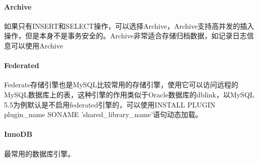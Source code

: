 \documentclass[../../../interview-questions.tex]{subfiles}
\begin{document}
 
\paragraph{Archive}

如果只有INSERT和SELECT操作，可以选择Archive，Archive支持高并发的插入操作，但是本身不是事务安全的。Archive非常适合存储归档数据，如记录日志信息可以使用Archive

\paragraph{Federated}

Federate存储引擎也是MySQL比较常用的存储引擎，使用它可以访问远程的MySQL数据库上的表，这种引擎的作用类似于Oracle数据库的dblink，以MySQL 5.5为例默认是不启用federated引擎的，可以使用INSTALL PLUGIN plugin\_name SONAME 'shared\_library\_name'语句动态加载。

\paragraph{InnoDB}

最常用的数据库引擎。
\end{document}
